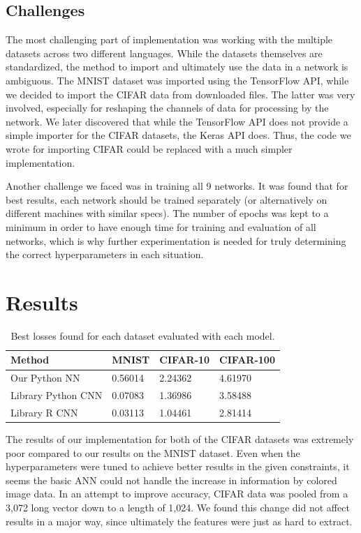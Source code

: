 \documentclass[letterpaper]{article} %
\begin{document}
\subsection{Challenges}
The most challenging part of implementation was working with the multiple datasets across
two different languages. While the datasets themselves are standardized, the method to import
and ultimately use the data in a network is ambiguous.
The MNIST dataset was imported using the TensorFlow API, while
we decided to import the CIFAR data from downloaded files.
The latter was very involved, especially for reshaping the channels of data for processing
by the network. We later discovered that while the TensorFlow API does not provide
a simple importer for the CIFAR datasets, the Keras API does.
Thus, the code we wrote for importing CIFAR could be replaced with a much simpler implementation.

Another challenge we faced was in training all 9 networks. It was found that for best results,
each network should be trained separately (or alternatively on different machines
with similar specs).
The number of epochs was kept to a minimum in order to have enough time for training and
evaluation of all networks, which is why further experimentation is needed for
truly determining the correct hyperparameters in each situation.

\section{Results}
\begin{table}[t]
\begin{centering}
\bgroup
\def\arraystretch{1.5}
\begin{tabular}{| m{} | m{} | m{} | m{} |} 
\hline
Method & MNIST & CIFAR-10 & CIFAR-100 \\ 
\hline
\hline
Our Python NN & 0.56014 & 2.24362 & 4.61970 \\
\hline
\hline
Library Python CNN & 0.07083 & 1.36986 & 3.58488\\
\hline
Library R CNN & 0.03113 & 1.04461 & 2.81414 \\
\hline
\end{tabular}
\caption{Best losses found for each dataset evaluated with each model.}
\label{tbl:fits}
\egroup
\end{centering}
\end{table}

The results of our implementation for both of the CIFAR datasets was extremely poor
compared to our results on the MNIST dataset.
Even when the hyperparameters were tuned to achieve better results in the given
constraints,
it seems the basic ANN could not handle the increase in information by colored image data.
In an attempt to improve accuracy, CIFAR data was pooled from a 3,072 long vector down
to a length of 1,024.
We found this change did not affect results in a major way,
since ultimately the features were just as hard to extract.
\end{document}

